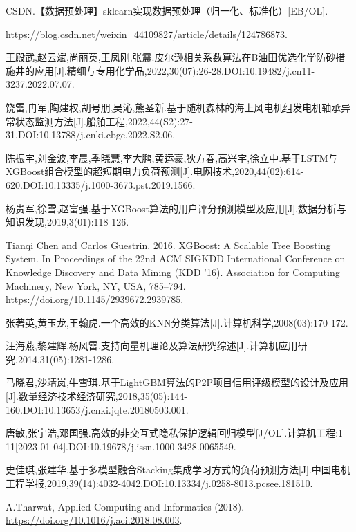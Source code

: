 \documentclass{MathorCupmodeling}
\begin{document}
	

	\newpage
	\begin{spacing}{1.08}
	\begin{thebibliography}{99}
	CSDN.【数据预处理】sklearn实现数据预处理（归一化、标准化）[EB/OL].
	
	\url{https://blog.csdn.net/weixin_44109827/article/details/124786873}.


	王殿武,赵云斌,尚丽英,王凤刚,张震.皮尔逊相关系数算法在B油田优选化学防砂措施井的应用[J].精细与专用化学品,2022,30(07):26-28.DOI:10.19482/j.cn11-3237.2022.07.07.

	饶雷,冉军,陶建权,胡号朋,吴沁,熊圣新.基于随机森林的海上风电机组发电机轴承异常状态监测方法[J].船舶工程,2022,44(S2):27-31.DOI:10.13788/j.cnki.cbgc.2022.S2.06.

	陈振宇,刘金波,李晨,季晓慧,李大鹏,黄运豪,狄方春,高兴宇,徐立中.基于LSTM与XGBoost组合模型的超短期电力负荷预测[J].电网技术,2020,44(02):614-620.DOI:10.13335/j.1000-3673.pst.2019.1566.

	杨贵军,徐雪,赵富强.基于XGBoost算法的用户评分预测模型及应用[J].数据分析与知识发现,2019,3(01):118-126.

	Tianqi Chen and Carlos Guestrin. 2016. XGBoost: A Scalable Tree Boosting System. In Proceedings of the 22nd ACM SIGKDD International Conference on Knowledge Discovery and Data Mining (KDD '16). Association for Computing Machinery, New York, NY, USA, 785–794. \url{https://doi.org/10.1145/2939672.2939785}.

	张著英,黄玉龙,王翰虎.一个高效的KNN分类算法[J].计算机科学,2008(03):170-172.

	汪海燕,黎建辉,杨风雷.支持向量机理论及算法研究综述[J].计算机应用研究,2014,31(05):1281-1286.

	马晓君,沙靖岚,牛雪琪.基于LightGBM算法的P2P项目信用评级模型的设计及应用[J].数量经济技术经济研究,2018,35(05):144-160.DOI:10.13653/j.cnki.jqte.20180503.001.

	唐敏,张宇浩,邓国强.高效的非交互式隐私保护逻辑回归模型[J/OL].计算机工程:1-11[2023-01-04].DOI:10.19678/j.issn.1000-3428.0065549.

	史佳琪,张建华.基于多模型融合Stacking集成学习方式的负荷预测方法[J].中国电机工程学报,2019,39(14):4032-4042.DOI:10.13334/j.0258-8013.pcsee.181510.

	A.Tharwat, Applied Computing and Informatics (2018). \url{https://doi.org/10.1016/j.aci.2018.08.003}.
	\end{thebibliography}
	\end{spacing}
	\newpage
\end{document}
